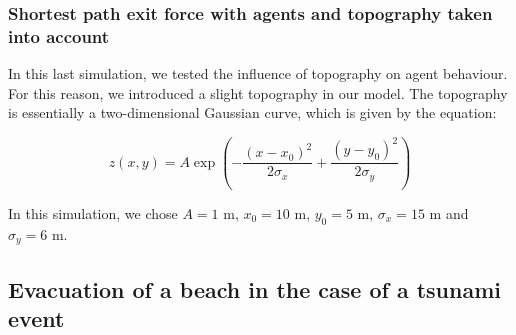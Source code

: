 \documentclass[11pt]{article}
\begin{document}
\subsubsection{Shortest path exit force with agents and topography taken into account}

In this last simulation, we tested the influence of topography on agent behaviour. For this reason, we introduced a slight topography in our model. The topography is essentially a two-dimensional Gaussian curve, which is given by the equation:

\begin{equation}
	z(x,y) = A\exp \left(- \frac{\left(x-x_0\right)^2}{2\sigma_x} + \frac{\left(y-y_0\right)^2}{2\sigma_y}\right)
\end{equation}

In this simulation, we chose $A = 1 $ m, $x_0 = 10$ m, $y_0 = 5$ m, $\sigma_x = 15$ m and $\sigma_y = 6$ m.

\subsection{Evacuation of a beach in the case of a tsunami event}
\end{document}
